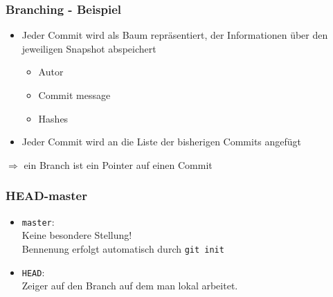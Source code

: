 \documentclass[12pt,utf8]{beamer}
\begin{document}
	\begin{frame}
		\frametitle{Branching - Beispiel}
		\begin{itemize}
			\item Jeder Commit wird als Baum repräsentiert, der Informationen über den jeweiligen Snapshot abspeichert
			\begin{itemize}
				\item Autor
				\item Commit message
				\item Hashes
			\end{itemize}
			\item Jeder Commit wird an die Liste der bisherigen Commits angefügt
		\end{itemize}
		$\Rightarrow$ ein Branch ist ein Pointer auf einen Commit
	\end{frame}

	\begin{frame}
		\frametitle{HEAD-master}
		\begin{itemize}
			\item \texttt{master}:\\
				Keine besondere Stellung!\\
				Bennenung erfolgt automatisch durch \texttt{git init}
			\item \texttt{HEAD}:\\
				Zeiger auf den Branch auf dem man lokal arbeitet.
		\end{itemize}
	\end{frame}

	\begin{frame}
		\begin{figure}[h]
			\centering
		\end{figure}
	\end{frame}
\end{document}
